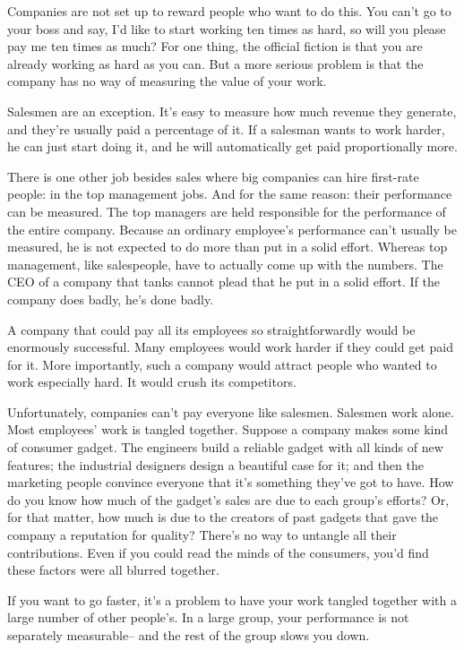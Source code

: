 Companies are not set up to reward people who want to do this. You can't
go to your boss and say, I'd like to start working ten times as hard, so
will you please pay me ten times as much? For one thing, the official
fiction is that you are already working as hard as you can. But a more
serious problem is that the company has no way of measuring the value of
your work.

Salesmen are an exception. It's easy to measure how much revenue they
generate, and they're usually paid a percentage of it. If a salesman
wants to work harder, he can just start doing it, and he will
automatically get paid proportionally more.

There is one other job besides sales where big companies can hire
first-rate people: in the top management jobs. And for the same reason:
their performance can be measured. The top managers are held responsible
for the performance of the entire company. Because an ordinary
employee's performance can't usually be measured, he is not expected to
do more than put in a solid effort. Whereas top management, like
salespeople, have to actually come up with the numbers. The CEO of a
company that tanks cannot plead that he put in a solid effort. If the
company does badly, he's done badly.

A company that could pay all its employees so straightforwardly would be
enormously successful. Many employees would work harder if they could
get paid for it. More importantly, such a company would attract people
who wanted to work especially hard. It would crush its competitors.

Unfortunately, companies can't pay everyone like salesmen. Salesmen work
alone. Most employees' work is tangled together. Suppose a company makes
some kind of consumer gadget. The engineers build a reliable gadget with
all kinds of new features; the industrial designers design a beautiful
case for it; and then the marketing people convince everyone that it's
something they've got to have. How do you know how much of the gadget's
sales are due to each group's efforts? Or, for that matter, how much is
due to the creators of past gadgets that gave the company a reputation
for quality? There's no way to untangle all their contributions. Even if
you could read the minds of the consumers, you'd find these factors were
all blurred together.

If you want to go faster, it's a problem to have your work tangled
together with a large number of other people's. In a large group, your
performance is not separately measurable-- and the rest of the group
slows you down.

